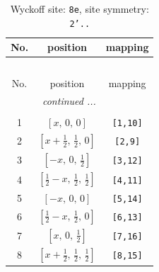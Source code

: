 \documentclass[fleqn,8pt]{jsarticle}
\begin{document}
\renewcommand{\arraystretch}{1.2}
\begin{longtable}{ccc}
\caption{Wyckoff site: {\tt 8e}, site symmetry: {\tt 2'..}}
 \\
 \hline \hline
No. & position & mapping \\ \hline \endfirsthead

\multicolumn{2}{l}{\tablename\ \thetable{}} \\
 \hline \hline
No. & position & mapping \\ \hline \endhead

 \hline \hline
\multicolumn{2}{r}{\footnotesize\it continued ...} \\ \endfoot

 \hline \hline
\multicolumn{2}{r}{} \\ \endlastfoot

1 & $\left[ x,\, 0,\, 0 \right]$ & {\tt [1,10]} \\ \hline
2 & $\left[ x + \frac{1}{2},\, \frac{1}{2},\, 0 \right]$ & {\tt [2,9]} \\ \hline
3 & $\left[ - x,\, 0,\, \frac{1}{2} \right]$ & {\tt [3,12]} \\ \hline
4 & $\left[ \frac{1}{2} - x,\, \frac{1}{2},\, \frac{1}{2} \right]$ & {\tt [4,11]} \\ \hline
5 & $\left[ - x,\, 0,\, 0 \right]$ & {\tt [5,14]} \\ \hline
6 & $\left[ \frac{1}{2} - x,\, \frac{1}{2},\, 0 \right]$ & {\tt [6,13]} \\ \hline
7 & $\left[ x,\, 0,\, \frac{1}{2} \right]$ & {\tt [7,16]} \\ \hline
8 & $\left[ x + \frac{1}{2},\, \frac{1}{2},\, \frac{1}{2} \right]$ & {\tt [8,15]} \\
\end{longtable}
\renewcommand{\arraystretch}{1.2}
\end{document}
